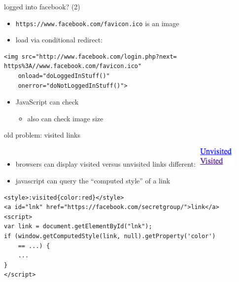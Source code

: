 \begin{frame}[fragile,label=inFB2]{logged into facebook? (2)}
    \begin{itemize}
        \item \texttt{https://www.facebook.com/favicon.ico} is an image
        \item load via conditional redirect:
    \end{itemize}
    \begin{verbatim}
<img src="http://www.facebook.com/login.php?next= https%3A//www.facebook.com/favicon.ico"
    onload="doLoggedInStuff()"
    onerror="doNotLoggedInStuff()">
\end{verbatim}
    \begin{itemize}
        \item JavaScript can check 
            \begin{itemize}
            \item also can check image size
            \end{itemize}
    \end{itemize}
\end{frame}


\begin{frame}[fragile,label=visitedLinks]{old problem: visited links}
    \begin{itemize}
    \item browsers can display visited versus unvisited links different:
        \includegraphics[width=2cm]{visitedunvisited}
    \item javascript can query the ``computed style'' of a link
    \end{itemize}
\begin{verbatim}
<style>:visited{color:red}</style>
<a id="lnk" href="https://facebook.com/secretgroup/">link</a>
<script>
var link = document.getElementById("lnk");
if (window.getComputedStyle(link, null).getProperty('color')
    == ...) {
    ...
}
</script>
\end{verbatim}
\end{frame}

